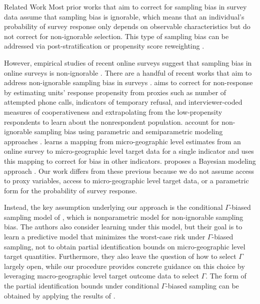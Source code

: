 \begin{subsection}{Related Work} 
	Most prior works that aim to correct for sampling bias in survey data assume that sampling bias is ignorable, which means that an individual's probability of survey response only depends on observable characteristics but do not correct for non-ignorable selection. This type of sampling bias can be addressed via post-stratification \citep{groves2008impact, groves2011survey, little1993post}  or propensity score reweighting \citep{david1983imputation,rosenbaum1983central,seaman2013review}.

	However, empirical studies of recent online surveys suggest that sampling bias in online surveys is non-ignorable \citep{bradley2021unrepresentative, kessler2022estimated}. There are a handful of recent works that aim to address non-ignorable sampling bias in surveys \citep{greenlees1982imputation,qin2002estimation, peress2010correcting, reitsma2022bias, wisniowski2020integrating}. \citet{peress2010correcting} aims to correct for non-response by estimating units' response propensity from proxies such as number of attempted phone calls, indicators of temporary refusal, and interviewer-coded measures of cooperativeness and extrapolating from the low-propensity respondents to learn about the nonrespondent population. \citet{greenlees1982imputation,qin2002estimation} account for non-ignorable sampling bias using parametric and semiparametric modeling approaches . \citet{reitsma2022bias} learns a mapping from micro-geographic level estimates from an online survey to micro-geographic level target data for a single indicator and uses this mapping to correct for bias in other indicators. \citet{wisniowski2020integrating} proposes a Bayesian modeling approach . Our work differs from these previous because we do not assume access to proxy variables, access to micro-geographic level target data, or a parametric form for the probability of survey response. 

	Instead, the key assumption underlying our approach is the conditional $\Gamma$-biased sampling model of \citet{sahoo2022learning}, which is nonparametric model for non-ignorable sampling bias. The authors also consider learning under this model, but their goal is to learn a predictive model that minimizes the worst-case risk under $\Gamma$-biased sampling, not to obtain partial identification bounds on micro-geographic level target quantities. Furthermore, they also leave the question of how to select $\Gamma$ largely open, while our procedure provides concrete guidance on this choice by leveraging macro-geographic level target outcome data to select $\Gamma$. The form of the partial identification bounds under conditional $\Gamma$-biased sampling can be obtained by applying the results of \citet{dorn2024doubly,rockafellar2000optimization}.
\end{subsection}





